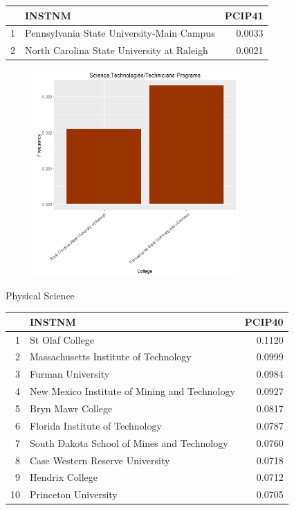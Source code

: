 \documentclass{article}
\begin{document}
\begin{table}[ht]
\centering
\begin{tabular}{rlr}
  \hline
 & INSTNM & PCIP41 \\ 
  \hline
1 & Pennsylvania State University-Main Campus & 0.0033 \\ 
  2 & North Carolina State University at Raleigh & 0.0021 \\ 
   \hline
\end{tabular}
\end{table}
\begin{figure}[H]
\includegraphics[width=0.7\textwidth]{../images/biggestTechnicians.png}
\end{figure}

\clearpage

Physical Science 
\begin{table}[ht]
\centering
\begin{tabular}{rlr}
  \hline
 & INSTNM & PCIP40 \\ 
  \hline
1 & St Olaf College & 0.1120 \\ 
  2 & Massachusetts Institute of Technology & 0.0999 \\ 
  3 & Furman University & 0.0984 \\ 
  4 & New Mexico Institute of Mining and Technology & 0.0927 \\ 
  5 & Bryn Mawr College & 0.0817 \\ 
  6 & Florida Institute of Technology & 0.0787 \\ 
  7 & South Dakota School of Mines and Technology & 0.0760 \\ 
  8 & Case Western Reserve University & 0.0718 \\ 
  9 & Hendrix College & 0.0712 \\ 
  10 & Princeton University & 0.0705 \\ 
   \hline
\end{tabular}
\end{table}
\end{document}
